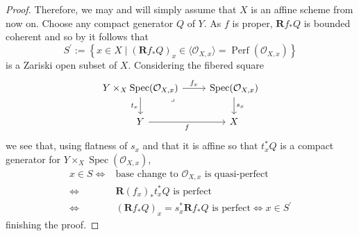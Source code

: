 \documentclass[11pt]{amsart}
\theoremstyle{plain}
\theoremstyle{definition}
\numberwithin{equation}{section}
\numberwithin{theorem}{section}
\begin{document}
\begin{proof}
    Therefore, we may and will simply assume that $X$ is an affine scheme from now on. Choose any compact generator $Q$ of $Y$. 
    As $f$ is proper, $\mathbf{R}f_\ast Q$ is bounded coherent and so by \cite[Proposition 3.5]{Letz:2021} it follows that
    \begin{displaymath}
        S^{\prime}:=\left\{ x\in X \mid (\mathbf{R}f_\ast Q)_x \in \langle \mathcal{O}_{X,x}\rangle =\operatorname{Perf}(\mathcal{O}_{X,x}) \right\}
    \end{displaymath}
    is a Zariski open subset of $X$. 
    Considering the fibered square
    \begin{displaymath}
        \begin{tikzcd}
            {Y\times_X \operatorname{Spec}(\mathcal{O}_{X,x})} & {\operatorname{Spec}(\mathcal{O}_{X,x})} \\
            Y & X
            \arrow["{f_x}", from=1-1, to=1-2]
            \arrow["{t_x}"', from=1-1, to=2-1]
            \arrow["{s_x}", from=1-2, to=2-2]
            \arrow["f"', from=2-1, to=2-2]
            \arrow["\lrcorner"{anchor=center, pos=0.125}, draw=none, from=1-1, to=2-2]
        \end{tikzcd}
    \end{displaymath}
    we see that, using flatness of $s_x$ and that it is affine so that $t_x^\ast Q$ is a compact generator for $Y\times_X \operatorname{Spec}(\mathcal{O}_{X,x})$,
    \begin{displaymath}
        \begin{aligned}
            x\in S \iff
            & \text{base change to }\mathcal{O}_{X,x} \textrm{ is quasi-perfect}\\\iff&    \mathbf{R}(f_x)_\ast t_x^\ast Q \text{ is perfect} 
            \\\iff&    (\mathbf{R}f_\ast Q)_x= s_x^\ast \mathbf{R}f_\ast Q \text{ is perfect} \iff x\in S^\prime
        \end{aligned}
    \end{displaymath}
    finishing the proof.     

\end{proof}
\end{document}
